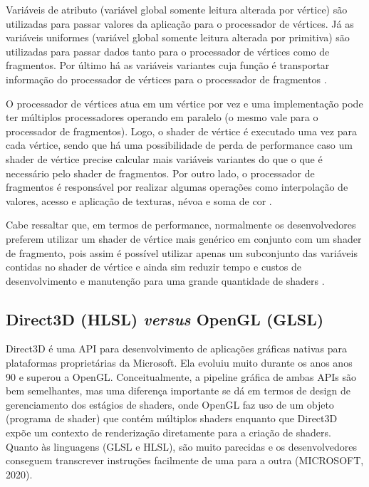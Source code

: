 Variáveis de atributo (variável global somente leitura alterada por vértice) são utilizadas para passar valores da aplicação para o processador de vértices. Já as variáveis uniformes (variável global somente leitura alterada por primitiva) são utilizadas para passar dados tanto para o processador de vértices como de fragmentos. Por último há as variáveis variantes cuja função é transportar informação do processador de vértices para o processador de fragmentos \cite{GLSLBook}.

O processador de vértices atua em um vértice por vez e uma implementação pode ter múltiplos processadores operando em paralelo (o mesmo vale para o processador de fragmentos). Logo, o shader de vértice é executado uma vez para cada vértice, sendo que há uma possibilidade de perda de performance caso um shader de vértice precise calcular mais variáveis variantes do que o que é necessário pelo shader de fragmentos. Por outro lado, o processador de fragmentos é responsável por realizar algumas operações como interpolação de valores, acesso e aplicação de texturas, névoa e soma de cor \cite{GLSLBook}. 

Cabe ressaltar que, em termos de performance, normalmente os desenvolvedores preferem utilizar um shader de vértice mais genérico em conjunto com um shader de fragmento, pois assim é possível utilizar apenas um subconjunto das variáveis contidas no shader de vértice e ainda sim reduzir tempo e custos de desenvolvimento e manutenção para uma grande quantidade de shaders \cite{GLSLBook}.

\subsection{Direct3D (HLSL) \textit{versus} OpenGL (GLSL)}
\label{sec:direct-versus-opengl}

Direct3D é uma API para desenvolvimento de aplicações gráficas nativas para plataformas proprietárias da Microsoft. Ela evoluiu muito durante os anos anos 90 e superou a OpenGL. Conceitualmente, a pipeline gráfica de ambas APIs são bem semelhantes, mas uma diferença importante se dá em termos de design de gerenciamento dos estágios de shaders, onde OpenGL faz uso de um objeto (programa de shader) que contém múltiplos shaders enquanto que Direct3D expõe um contexto de renderização diretamente para a criação de shaders. Quanto às linguagens (GLSL e HLSL), são muito parecidas e os desenvolvedores conseguem transcrever instruções facilmente de uma para a outra (MICROSOFT, 2020)\nocite{Direct3D}.

